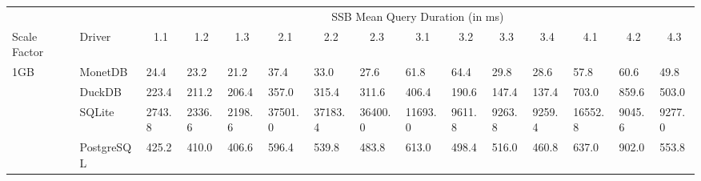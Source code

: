 \begin{table}[]
\begin{tabular}{ll|lllllllllllll}
                     &            & \multicolumn{13}{c|}{SSB Mean Query Duration (in ms)}                                                                                                                                                                                                                                                                                           \\
Scale Factor         & Driver     & \multicolumn{1}{c}{1.1} & \multicolumn{1}{c}{1.2} & \multicolumn{1}{c}{1.3} & \multicolumn{1}{c}{2.1} & \multicolumn{1}{c}{2.2} & \multicolumn{1}{c}{2.3} & \multicolumn{1}{c}{3.1} & \multicolumn{1}{c}{3.2} & \multicolumn{1}{c}{3.3} & \multicolumn{1}{c}{3.4} & \multicolumn{1}{c}{4.1} & \multicolumn{1}{c}{4.2} & \multicolumn{1}{c}{4.3} \\ \hline
\multirow{5}{*}{1GB} & MonetDB    & 24.4                    & 23.2                    & 21.2                    & 37.4                    & 33.0                    & 27.6                    & 61.8                    & 64.4                    & 29.8                    & 28.6                    & 57.8                    & 60.6                    & 49.8                    \\
                     & DuckDB     & 223.4                   & 211.2                   & 206.4                   & 357.0                   & 315.4                   & 311.6                   & 406.4                   & 190.6                   & 147.4                   & 137.4                   & 703.0                   & 859.6                   & 503.0                   \\
                     & SQLite     & 2743.8                  & 2336.6                  & 2198.6                  & 37501.0                 & 37183.4                 & 36400.0                 & 11693.0                 & 9611.8                  & 9263.8                  & 9259.4                  & 16552.8                 & 9045.6                  & 9277.0                  \\
                     & PostgreSQL & 425.2                   & 410.0                   & 406.6                   & 596.4                   & 539.8                   & 483.8                   & 613.0                   & 498.4                   & 516.0                   & 460.8                   & 637.0                   & 902.0                   & 553.8                   \\

\end{tabular}
\end{table}
